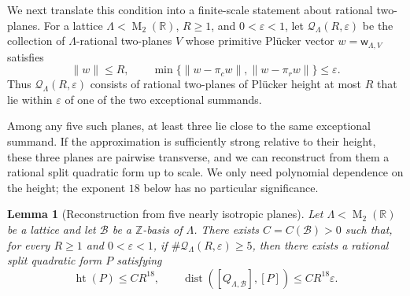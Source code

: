 \documentclass[reqno,11pt]{amsart}
\newtheorem{lem}[lem]{Lemma}
\theoremstyle{definition}
\theoremstyle{remark}
\numberwithin{equation}{section}
\newcommand{\M}{\operatorname{M}}
\begin{document}
We next translate this condition into a finite-scale statement about
rational two-planes. For a lattice $\Lambda<\M_2(\mathbb R)$, $R\ge1$, and
$0<\varepsilon<1$, let $\mathcal Q_\Lambda(R,\varepsilon)$ be the
collection of $\Lambda$-rational two-planes $V$ whose primitive Pl\"ucker
vector $w=\mathsf w_{\Lambda,V}$ satisfies
$$
\|w\|\le R,
\qquad
\min\{\|w-\pi_cw\|,\|w-\pi_rw\|\}\le\varepsilon.
$$
Thus $\mathcal Q_\Lambda(R,\varepsilon)$ consists of rational two-planes of
Pl\"ucker height at most $R$ that lie within $\varepsilon$ of one of the
two exceptional summands.

Among any five such planes, at least three lie close to the same
exceptional summand. If the approximation is sufficiently strong relative
to their height, these three planes are pairwise transverse, and we can
reconstruct from them a rational split quadratic form up to scale. We
only need polynomial dependence on the height; the exponent $18$ below
has no particular significance.


\begin{lem}[Reconstruction from five nearly isotropic planes]
\label{lem:d2-reconstruction-from-quasinull}
Let $\Lambda<\M_2(\mathbb R)$ be a lattice and let $\mathcal B$ be a
$\mathbb Z$-basis of $\Lambda$. There exists $C=C(\mathcal B)>0$ such
that, for every $R\ge1$ and $0<\varepsilon<1$, if
$\#\mathcal Q_\Lambda(R,\varepsilon)\ge5$, then there exists a rational
split quadratic form $P$ satisfying
\begin{equation}\label{eq:rational-split-reconstruction}
\operatorname{ht}(P)\le CR^{18},
\qquad
\operatorname{dist}([Q_{\Lambda,\mathcal B}],[P])
\le CR^{18}\varepsilon.
\end{equation}
\end{lem}
\end{document}
